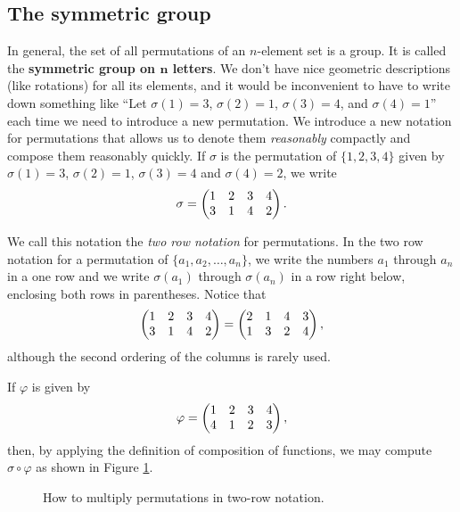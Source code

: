 \subsection{The symmetric group}
In general, the set of all permutations of an $n$-element set is a
group.  It is called the {\bf symmetric group on $\mathbf n$
letters}.  We don't have nice geometric
descriptions (like rotations) for all its elements, and it would be
inconvenient to have to write down something like ``Let $\sigma(1) =3$,
$\sigma(2) =1$, $\sigma(3)=4$, and $\sigma(4)=1$'' each time we need to
introduce a new permutation.  We introduce a new notation for
permutations that allows us to denote them {\em reasonably} compactly and
compose them reasonably quickly.  If
$\sigma$ is the permutation of
$\{1,2,3,4\}$ given by
$\sigma(1)=3$, $\sigma(2)=1$,
$\sigma(3) =4$ and $\sigma(4) =2$,
we write 
$$\sigma =\left( \begin{matrix}1&2&3&4\cr3&1&4&2\end{matrix}\right).$$

We call this notation the {\em two row notation} for permutations.  In the two row
notation for a permutation of $\{a_1,a_2,\ldots, a_n\}$, we write the
numbers $a_1$ through
$a_n$ in a one row and we write $\sigma(a_1)$ through $\sigma(a_n)$ in a
row right below, enclosing both rows in parentheses.  Notice that 
 $$\left( \begin{matrix}1&2&3&4\cr3&1&4&2\end{matrix}\right) = \left(
\begin{matrix}2&1&4&3\cr1&3&2&4\end{matrix}\right),$$
 although the second ordering of the columns is rarely used.

If $\varphi$ is given by
$$\varphi = \begin{pmatrix}1&2&3&4\cr4&1&2&3\end{pmatrix},$$
then, by applying the definition of composition of functions, we may compute
$\sigma\circ
\varphi$ as shown in Figure
\ref{permutationproduct}. 


\begin{figure}[htb]\caption{How to
multiply permutations in two-row
notation.}\label{permutationproduct}\vspace*{-1in}
\mbox{}
\end{figure}

